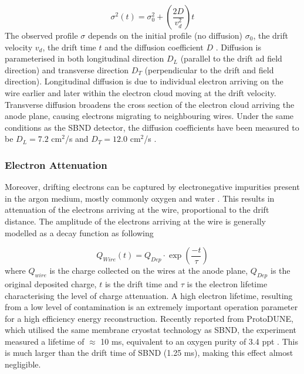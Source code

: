 \begin{equation}
	\sigma^{2} (t) = \sigma^{2}_{0} + \left(\frac{2D}{v^{2}_{d}}\right)t
\end{equation}
The observed profile $\sigma$ depends on the initial profile (no diffusion) $\sigma_{0}$, the drift velocity $v_{d}$, the drift time $t$ and the diffusion coefficient $D$ \cite{}.
Diffusion is parameterised in both longitudinal direction $D_{L}$ (parallel to the drift ad field direction) and transverse direction $D_{T}$ (perpendicular to the drift and field direction).
Longitudinal diffusion is due to individual electron arriving on the wire earlier and later within the electron cloud moving at the drift velocity.
Transverse diffusion broadens the cross section of the electron cloud arriving the anode plane, causing electrons migrating to neighbouring wires.
Under the same conditions as the SBND detector, the diffusion coefficients have been measured to be $D_{L} = 7.2 $ cm$^{2}$/s and $D_T = 12.0 $ cm$^{2}$/s \cite{}.


\subsubsection{Electron Attenuation}
Moreover, drifting electrons can be captured by electronegative impurities present in the argon medium, mostly commonly oxygen and water \cite{}.
This results in attenuation of the electrons arriving at the wire, proportional to the drift distance. 
The amplitude of the electrons arriving at the wire is generally modelled as a decay function as following

\begin{equation}
	Q_{Wire} (t) = Q_{Dep} \cdot \exp\left(\frac{-t}{\tau}\right)
\end{equation}
where $Q_{wire}$ is the charge collected on the wires at the anode plane, $Q_{Dep}$ is the original deposited charge, $t$ is the drift time and $\tau$ is the electron lifetime characterising the level of charge attenuation.
A high electron lifetime, resulting from a low level of contamination is an extremely important operation parameter for a high efficiency energy reconstruction.
Recently reported from ProtoDUNE, which utilised the same membrane cryostat technology as SBND, the experiment measured a lifetime of $\approx$ 10 ms, equivalent to an oxygen purity of 3.4 ppt \cite{}.
This is much larger than the drift time of SBND (1.25 ms), making this effect almost negligible. 


